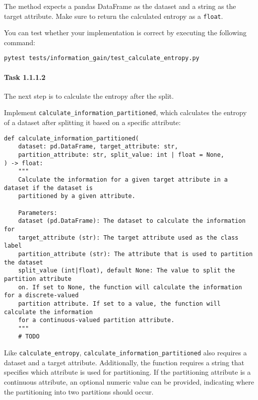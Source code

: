 \documentclass[
english,
smallborders
]{i6prcsht}
\begin{document}
\vspace*{0.1cm}

The method expects a pandas DataFrame as the dataset and a string as the target attribute. Make sure to return the calculated entropy as a \texttt{float}.

You can test whether your implementation is correct by executing the following command:

\vspace*{0.3cm}

\begin{lstlisting}
pytest tests/information_gain/test_calculate_entropy.py
\end{lstlisting}

\vspace*{0.1cm}

\paragraph*{Task 1.1.1.2} \hfill

The next step is to calculate the entropy after the split.

Implement \texttt{calculate\_information\_partitioned}, which calculates the entropy of a dataset after splitting it based on a specific attribute:

\vspace*{0.3cm}

\begin{lstlisting}
def calculate_information_partitioned(
	dataset: pd.DataFrame, target_attribute: str,
	partition_attribute: str, split_value: int | float = None,
) -> float:
	"""
	Calculate the information for a given target attribute in a dataset if the dataset is
	partitioned by a given attribute.

	Parameters:
	dataset (pd.DataFrame): The dataset to calculate the information for
	target_attribute (str): The target attribute used as the class label
	partition_attribute (str): The attribute that is used to partition the dataset
	split_value (int|float), default None: The value to split the partition attribute
	on. If set to None, the function will calculate the information for a discrete-valued
	partition attribute. If set to a value, the function will calculate the information
	for a continuous-valued partition attribute.
	"""
	# TODO
\end{lstlisting}

\vspace*{0.1cm}

Like \texttt{calculate\_entropy}, \texttt{calculate\_information\_partitioned} also requires a dataset and a target attribute. Additionally, the function requires a string that specifies which attribute is used for partitioning. If the partitioning attribute is a continuous attribute, an optional numeric value can be provided, indicating where the partitioning into two partitions should occur.
\end{document}
